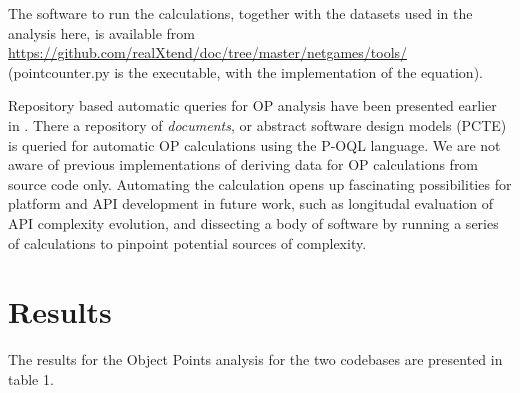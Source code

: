\documentclass[conference]{IEEEtran}
\newlength{\DUtablewidth} %
\begin{document}
The software to run the calculations, together with the datasets used
in the analysis here, is available from
\url{https://github.com/realXtend/doc/tree/master/netgames/tools/}
(pointcounter.py is the executable, with the implementation of the equation).

Repository based automatic queries for OP analysis have been presented
earlier in \cite{henrich97repositorybased}. There a repository of
\emph{documents}, or abstract software design models (PCTE) is queried for
automatic OP calculations using the P-OQL language. We are not aware
of previous implementations of deriving data for OP calculations from
source code only. Automating the calculation opens up fascinating
possibilities for platform and API development in future work, such as
longitudal evaluation of API complexity evolution, and dissecting a
body of software by running a series of calculations to pinpoint
potential sources of complexity.


\section{Results%
  \label{results}%
}

The results for the Object Points analysis for the two codebases are
presented in table 1.

\setlength{\DUtablewidth}{\linewidth}
\end{document}
